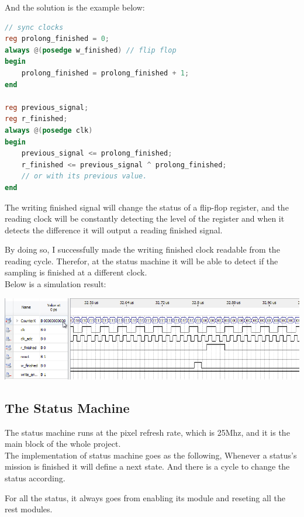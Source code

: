 \documentclass[11pt]{scrartcl}
\begin{document}
And the solution is the example below:
\begin{lstlisting}[language=Verilog]
// sync clocks
reg prolong_finished = 0;
always @(posedge w_finished) // flip flop
begin
	prolong_finished = prolong_finished + 1;
end

reg previous_signal;
reg r_finished;
always @(posedge clk) 
begin
	previous_signal <= prolong_finished; 
	r_finished <= previous_signal ^ prolong_finished;
	// or with its previous value.
end
\end{lstlisting}

The writing finished signal will change the status of a flip-flop register, and the reading clock will be constantly detecting the level of the register and when  it detects the difference it will output a reading finished signal.

By doing so, I successfully made the writing finished clock readable from the reading cycle. Therefor, at the status machine it will be able to detect if the sampling is finished at a different clock.\\


Below is a simulation result:

\begin{minipage}[t]{\linewidth}

{
\includegraphics[scale = 0.5]{dualram.png}
}
\end{minipage}
\medskip

\subsection{The Status Machine}
The status machine runs at the pixel refresh rate, which is 25Mhz, and it is the main block of the whole project. \\


The implementation of status machine goes as the following, Whenever a status's mission is finished it will define a next state. And there is a cycle to change the status according. 

For all the status, it always goes from enabling its module and reseting all the rest modules. \\
\end{document}
